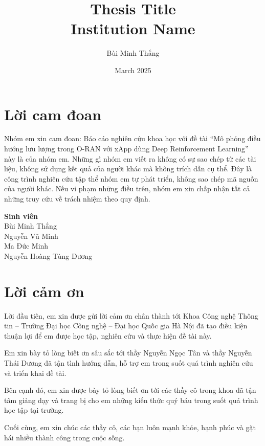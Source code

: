 \documentclass[12pt]{report}
\title{
    {Thesis Title}\\
    {\large Institution Name}\\
}
\author{Bùi Minh Thắng}
\date{March 2025}
\begin{document}




\chapter*{Lời cam đoan}
Nhóm em xin cam đoan: Báo cáo nghiên cứu khoa học với đề tài “Mô phỏng điều hướng lưu lượng trong O-RAN với xApp dùng Deep Reinforcement Learning” này là của nhóm em. Những gì nhóm em viết ra không có sự sao chép từ các tài liệu, không sử dụng kết quả của người khác mà không trích dẫn cụ thể. Đây là công trình nghiên cứu tập thể nhóm em tự phát triển, không sao chép mã nguồn của người khác. Nếu vi phạm những điều trên, nhóm em xin chấp nhận tất cả những truy cứu về trách nhiệm theo quy định.

\vspace{2cm} %
\noindent
\hfill
\begin{minipage}{0.4\textwidth}
    \centering
    \textbf{Sinh viên}\\[1cm] %
    Bùi Minh Thắng\\
    Nguyễn Vũ Minh\\
    Ma Đức Minh\\
    Nguyễn Hoàng Tùng Dương\\
\end{minipage}

\chapter*{Lời cảm ơn}
Lời đầu tiên, em xin được gửi lời cảm ơn chân thành tới Khoa Công nghệ Thông tin – Trường Đại học Công nghệ – Đại học Quốc gia Hà Nội đã tạo điều kiện thuận lợi để em được học tập, nghiên cứu và thực hiện đề tài này.

Em xin bày tỏ lòng biết ơn sâu sắc tới thầy Nguyễn Ngọc Tân và thầy Nguyễn Thái Dương đã tận tình hướng dẫn, hỗ trợ em trong suốt quá trình nghiên cứu và triển khai đề tài.

Bên cạnh đó, em xin được bày tỏ lòng biết ơn tới các thầy cô trong khoa đã tận tâm giảng dạy và trang bị cho em những kiến thức quý báu trong suốt quá trình học tập tại trường.

Cuối cùng, em xin chúc các thầy cô, các bạn luôn mạnh khỏe, hạnh phúc và gặt hái nhiều thành công trong cuộc sống.
\end{document}
